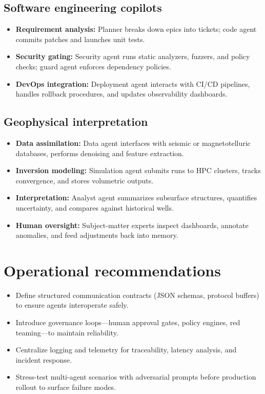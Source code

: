 \documentclass{article}
\begin{document}
\subsection{Software engineering copilots}
\begin{itemize}
  \item \textbf{Requirement analysis:} Planner breaks down epics into tickets; code agent commits patches and launches unit tests.
  \item \textbf{Security gating:} Security agent runs static analyzers, fuzzers, and policy checks; guard agent enforces dependency policies.
  \item \textbf{DevOps integration:} Deployment agent interacts with CI/CD pipelines, handles rollback procedures, and updates observability dashboards.
\end{itemize}

\subsection{Geophysical interpretation}
\begin{itemize}
  \item \textbf{Data assimilation:} Data agent interfaces with seismic or magnetotelluric databases, performs denoising and feature extraction.
  \item \textbf{Inversion modeling:} Simulation agent submits runs to HPC clusters, tracks convergence, and stores volumetric outputs.
  \item \textbf{Interpretation:} Analyst agent summarizes subsurface structures, quantifies uncertainty, and compares against historical wells.
  \item \textbf{Human oversight:} Subject-matter experts inspect dashboards, annotate anomalies, and feed adjustments back into memory.
\end{itemize}

\section*{Operational recommendations}
\begin{itemize}
  \item Define structured communication contracts (JSON schemas, protocol buffers) to ensure agents interoperate safely.
  \item Introduce governance loops—human approval gates, policy engines, red teaming—to maintain reliability.
  \item Centralize logging and telemetry for traceability, latency analysis, and incident response.
  \item Stress-test multi-agent scenarios with adversarial prompts before production rollout to surface failure modes.
\end{itemize}
\end{document}
